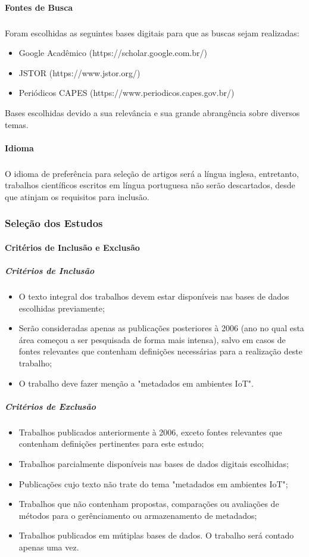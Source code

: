 \paragraph{Fontes de Busca}
\subparagraph{}
 Foram escolhidas as seguintes bases digitais para que as buscas sejam realizadas:
\begin{itemize}
  \item Google Acadêmico (https://scholar.google.com.br/)
  \item JSTOR (https://www.jstor.org/)
  \item Periódicos CAPES (https://www.periodicos.capes.gov.br/)
\end{itemize}
\quad Bases escolhidas devido a sua relevância e sua grande abrangência sobre diversos temas.
\pagebreak
\paragraph{Idioma}
\subparagraph{}
\quad O idioma de preferência para seleção de artigos será a língua inglesa, entretanto, trabalhos científicos escritos em
língua portuguesa não serão descartados, desde que atinjam os requisitos para inclusão.

\subsubsection{Seleção dos Estudos}
\paragraph{Critérios de Inclusão e Exclusão}
\subparagraph{Critérios de Inclusão}
\begin{itemize}
  \item O texto integral dos trabalhos devem estar disponíveis nas bases de dados escolhidas previamente;
  \item Serão consideradas apenas as publicações posteriores à 2006 (ano no qual esta área começou a ser pesquisada de forma mais intensa), salvo em casos de fontes relevantes que contenham definições necessárias para a realização deste trabalho;
  \item O trabalho deve fazer menção a "metadados em ambientes \acrlong{IoT}".
\end{itemize}

\subparagraph{Critérios de Exclusão}
\begin{itemize}
  \item Trabalhos publicados anteriormente à 2006, exceto fontes relevantes que contenham definições pertinentes para este estudo;
  \item Trabalhos parcialmente disponíveis nas bases de dados digitais escolhidas;
  \item Publicações cujo texto não trate do tema "metadados em ambientes \acrshort{IoT}";
  \item Trabalhos que não contenham propostas, comparações ou avaliações de métodos para o gerênciamento ou armazenamento de metadados;
  \item Trabalhos publicados em mútiplas bases de dados. O trabalho será contado apenas uma vez.
\end{itemize}

